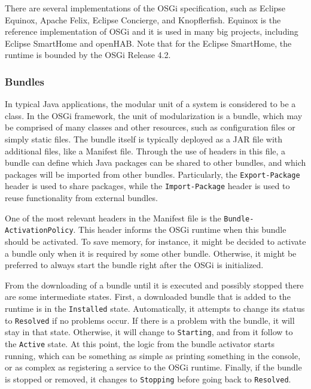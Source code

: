 \documentclass[12pt]{article}
\begin{document}
There are several implementations of the OSGi specification, such as Eclipse Equinox, Apache Felix, Eclipse Concierge, and Knopflerfish. Equinox is the reference implementation of OSGi and it is used in many big projects, including Eclipse SmartHome and openHAB. Note that for the Eclipse SmartHome, the runtime is bounded by the OSGi Release 4.2. 

\subsubsection{Bundles}

In typical Java applications, the modular unit of a system is considered to be a class. In the OSGi framework, the unit of modularization is a bundle, which may be comprised of many classes and other resources, such as configuration files or simply static files. The bundle itself is typically deployed as a JAR file with additional files, like a Manifest file. Through the use of headers in this file, a bundle can define which Java packages can be shared to other bundles, and which packages will be imported from other bundles. Particularly, the \texttt{Export-Package} header is used to share packages, while the \texttt{Import-Package} header is used to reuse functionality from external bundles.

One of the most relevant headers in the Manifest file is the \texttt{Bundle-ActivationPolicy}. This header informs the OSGi runtime when this bundle should be activated. To save memory, for instance, it might be decided to activate a bundle only when it is required by some other bundle. Otherwise, it might be preferred to always start the bundle right after the OSGi is initialized. 

From the downloading of a bundle until it is executed and possibly stopped there are some intermediate states. First, a downloaded bundle that is added to the runtime is in the \texttt{Installed} state. Automatically, it attempts to change its status to \texttt{Resolved} if no problems occur. If there is a problem with the bundle, it will stay in that state. Otherwise, it will change to \texttt{Starting}, and from it follow to the \texttt{Active} state. At this point, the logic from the bundle activator starts running, which can be something as simple as printing something in the console, or as complex as registering a service to the OSGi runtime. Finally, if the bundle is stopped or removed, it changes to \texttt{Stopping} before going back to \texttt{Resolved}.
\end{document}
